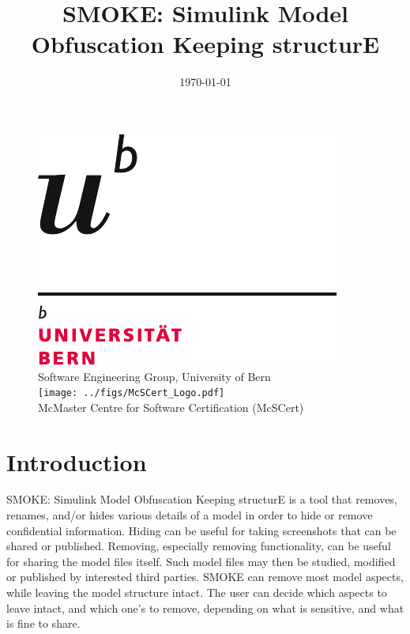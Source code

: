 \documentclass{article}
\makeatletter
\newcommand{\ToolName}{SMOKE: Simulink Model Obfuscation Keeping structurE\@\xspace}
\newcommand{\toolname}{SMOKE\@\xspace}
\makeatother
\begin{document}
\title{\ToolName}
\date{\monthyeardate\today}
\maketitle
\vfill

\begin{figure}
	\centering
	\includegraphics[width=.2\textwidth]{../figs/uni_bern_logo.pdf}\\ 
	Software Engineering Group, University of Bern\\
	\texttt{[image: ../figs/McSCert\_Logo.pdf]} \\
	McMaster Centre for Software Certification (McSCert)
\end{figure}

\newpage


\tableofcontents
\newpage

\section{Introduction}

\ToolName is a tool that removes, renames, and/or hides various details of a \Simulink model in order to hide or remove confidential information.
Hiding can be useful for taking screenshots that can be shared or published. Removing, especially removing functionality, can be useful
for sharing the model files itself. Such model files may then be studied, modified or published by interested third parties.
 \toolname can remove most model aspects, while leaving the model structure intact. The user 
can decide which aspects to leave intact, and which one's to remove, depending on what is sensitive, and what is fine to share.
\end{document}
